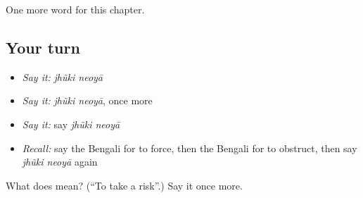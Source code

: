 \begin{grammarlens}[title={What you've built}]
One more word for this chapter.
\end{grammarlens}

\subsection*{Your turn}
\begin{itemize}
\raggedright
  \item \emph{Say it:} \emph{jhũki neoyā}
  \item \emph{Say it:} \emph{jhũki neoyā}, once more
  \item \emph{Say it:} say \emph{jhũki neoyā}
  \item \emph{Recall:} say the Bengali for to force, then the Bengali for to obstruct, then say \emph{jhũki neoyā} again
\end{itemize}

\begin{tcolorbox}[breakable,colback=teal!4,colframe=teal!35!black,title={Before you move on}]
What does   mean? (\textquotedblleft{}To take a risk\textquotedblright{}.) Say it once more.
\end{tcolorbox}
